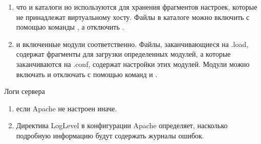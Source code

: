 \documentclass[letterpaper,10pt,russian]{sphinxmanual}
\begin{document}
\begin{enumerate}
\begin{description}
\end{description}

\item {} \begin{description}
\sphinxAtStartPar
что и каталоги  но используются для хранения фрагментов настроек,
которые не принадлежат виртуальному хосту. Файлы в каталоге  можно включить
с помощью команды , а отключить \textendash{} .

\end{description}

\item {} \begin{description}
\sphinxAtStartPar
и включенные модули соответственно. Файлы, заканчивающиеся на .load, содержат фрагменты для
загрузки определенных модулей, а которые заканчиваются на .conf, содержат настройки этих модулей.
Модули можно включать и отключать с помощью команд  и .

\end{description}

\end{enumerate}

\sphinxAtStartPar
Логи сервера
\begin{enumerate}
%
\item {} \begin{description}
\sphinxAtStartPar
если Apache не настроен иначе.

\end{description}

\item {} \begin{description}
\sphinxAtStartPar
Директива LogLevel в конфигурации Apache определяет, насколько подробную информацию будут содержать журналы ошибок.

\end{description}

\end{enumerate}
\end{document}
